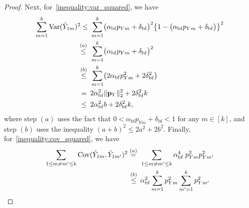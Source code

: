 \documentclass[twoside,11pt]{article}
\newcommand{\rvTwo}{Y}
\newcommand{\private}[1]{\tilde{#1}}
\newcommand{\normSqMultinomMax}{b}
\newcommand{\alphabetSize}{k} %
\newcommand{\vectorIndex}{m}
\newcommand{\probVecElement}[2]{p_{{#1}{#2}}}
\newcommand{\probVec}{\mathbf{p}} %
\newcommand{\privacyParameter}{\alpha} %
\newcommand{\privacyParameterrappor}{\privacyParameter_{\mathrm{bf}}}
\newcommand{\smallNumber}{\delta}
\newcommand{\smallNumberrappor}{\smallNumber_{\mathrm{bf}}}
\begin{document}
\begin{appendix}
\begin{proof}
		Next, for~\eqref{inequality:var_squared}, we have 
		\begin{align*}
			\sum_{\vectorIndex = 1}^\alphabetSize
			\mathrm{Var}(\private{Y}_{1 \vectorIndex})^2
			\leq ~&
			\sum_{\vectorIndex = 1}^\alphabetSize
			\bigl(
			\privacyParameterrappor 
			\probVecElement{\rvTwo}{\vectorIndex}
			+ \smallNumberrappor
			\bigr)^2
			\bigl\{
			1
			-
			\bigl(
			\privacyParameterrappor 
			\probVecElement{\rvTwo}{\vectorIndex}
			+ \smallNumberrappor
			\bigr)
			\bigr\}^2	
			\\\stackrel{(a)}{\leq} \hskip 1.57mm &
			\sum_{\vectorIndex = 1}^\alphabetSize
			\bigl(
			\privacyParameterrappor 
			\probVecElement{\rvTwo}{\vectorIndex}
			+ \smallNumberrappor
			\bigr)^2
			\\\stackrel{(b)}{\leq} \hskip 1.57mm &
			\sum_{\vectorIndex = 1}^\alphabetSize
			\bigl(
			2\privacyParameterrappor 
			\probVecElement{\rvTwo}{\vectorIndex}^2
			+ 2\smallNumberrappor^2
			\bigr)
			\\= \hskip 1.8mm &
			2
			\privacyParameterrappor^2
			\|\probVec_\rvTwo\|_2^2
			+
			2
			\smallNumberrappor^2
			\alphabetSize
			\\ \leq \hskip 1.75mm &
			2
			\privacyParameterrappor^2
			\normSqMultinomMax
			+
			2
			\smallNumberrappor^2
			\alphabetSize
			,
		\end{align*}
		where step $(a)$ uses the fact that
		\( 0 < \privacyParameterrappor \probVecElement{\rvTwo}{\vectorIndex} + \smallNumberrappor < 1 \) for any $\vectorIndex \in [\alphabetSize]$,
		and step $(b)$ uses the inequality $(a+b)^2 \leq 2a^2 + 2b^2.$
		Finally, for~\eqref{inequality:cov_squared}, we have
		\begin{align*}
			\sum_{1 \leq \vectorIndex \neq \vectorIndex' \leq \alphabetSize}
			\mathrm{Cov}(\private{Y}_{1 \vectorIndex}, \private{Y}_{1 \vectorIndex'})^2
			\stackrel{(a)}{=} \hskip 1.57mm &
			\sum_{1 \leq \vectorIndex \neq \vectorIndex' \leq \alphabetSize}
			\privacyParameterrappor^4
			\;
			\probVecElement{\rvTwo}{\vectorIndex}^2
			\probVecElement{\rvTwo}{\vectorIndex'}^2
			\\ \stackrel{(b)}{\leq} \hskip 1.57mm &
			\privacyParameterrappor^2
			\sum_{\vectorIndex=1}^\alphabetSize
			\probVecElement{\rvTwo}{\vectorIndex}^2
			\sum_{\vectorIndex'=1}^\alphabetSize
			\probVecElement{\rvTwo}{\vectorIndex'}^2

\end{align*}
\end{proof}
\end{appendix}
\end{document}
